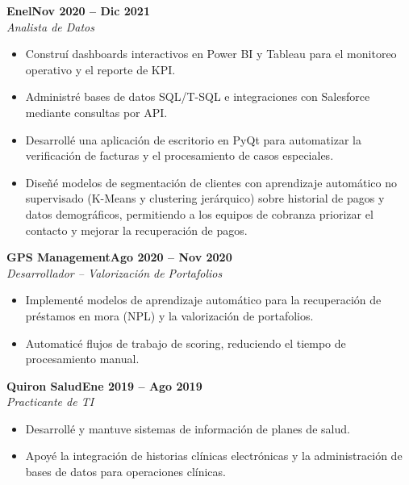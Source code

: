 \documentclass[10pt,letterpaper]{article}
\newcommand{\entrynoloc}[3]{%
  \vspace{3pt}\noindent\textbf{#1}\hfill\textbf{#2}\\[-1pt]
  \noindent\textit{#3}\par\vspace{1pt}}
\begin{document}
\entrynoloc{Enel}{Nov 2020 -- Dic 2021}{Analista de Datos}
\begin{itemize}
\item Construí dashboards interactivos en Power BI y Tableau para el monitoreo operativo y el reporte de KPI.
\item Administré bases de datos SQL/T-SQL e integraciones con Salesforce mediante consultas por API.
\item Desarrollé una aplicación de escritorio en PyQt para automatizar la verificación de facturas y el procesamiento de casos especiales.
\item Diseñé modelos de segmentación de clientes con aprendizaje automático no supervisado (K-Means y clustering jerárquico) sobre historial de pagos y datos demográficos, permitiendo a los equipos de cobranza priorizar el contacto y mejorar la recuperación de pagos.
\end{itemize}

\entrynoloc{GPS Management}{Ago 2020 -- Nov 2020}{Desarrollador -- Valorización de Portafolios}
\begin{itemize}
\item Implementé modelos de aprendizaje automático para la recuperación de préstamos en mora (NPL) y la valorización de portafolios.
\item Automaticé flujos de trabajo de scoring, reduciendo el tiempo de procesamiento manual.
\end{itemize}

\entrynoloc{Quiron Salud}{Ene 2019 -- Ago 2019}{Practicante de TI}
\begin{itemize}
\item Desarrollé y mantuve sistemas de información de planes de salud.
\item Apoyé la integración de historias clínicas electrónicas y la administración de bases de datos para operaciones clínicas.
\end{itemize}
\end{document}
